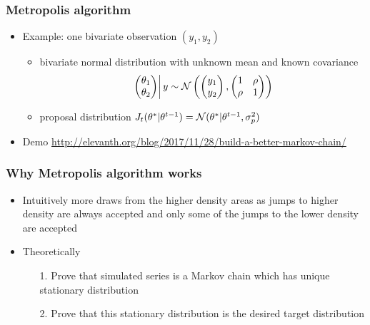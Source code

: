 \documentclass[10pt]{beamer}
\begin{document}
\begin{frame}

\frametitle{ Metropolis algorithm}

  \begin{itemize}
  \item Example: one bivariate observation $(y_1,y_2)$
    \begin{itemize}
    \item bivariate normal distribution with unknown mean and known
      covariance
       \begin{equation*}
         \left.
         \begin{pmatrix}
           \theta_1\\
           \theta_2
         \end{pmatrix}
         \right| y \sim
         \mathcal{N}\left(
           \begin{pmatrix}
             y_1\\
             y_2
           \end{pmatrix},
           \begin{pmatrix}
             1 & \rho\\
             \rho & 1
         \end{pmatrix}
       \right)
       \end{equation*}
     \item proposal distribution
       $J_t(\theta^{*}|\theta^{t-1})=\mathcal{N}(\theta^{*}|\theta^{t-1},\sigma_p^2)$
     \end{itemize}
   \item Demo {\small \url{http://elevanth.org/blog/2017/11/28/build-a-better-markov-chain/}}
   \end{itemize}

\end{frame}

 \begin{frame}

\frametitle{ Why Metropolis algorithm works}

  \begin{itemize}
  \item Intuitively more draws from the higher density areas as
    jumps to higher density are always accepted and only some of the
    jumps to the lower density are accepted
    \vspace{5mm}
    \pause
  \item Theoretically
    \begin{itemize}
    \item[1.] Prove that simulated series is a Markov chain
      which has unique stationary distribution
    \item[2.] Prove that this stationary distribution is the desired target distribution
    \end{itemize}
\end{itemize}

\end{frame}
\end{document}
